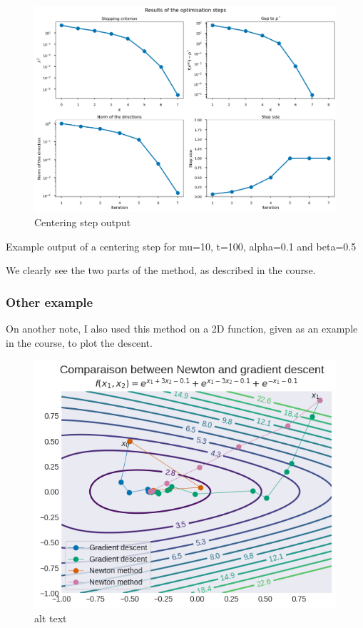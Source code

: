 \documentclass[11pt]{article}
\begin{document}
\begin{figure}
\centering
\includegraphics{outputs/example_output_centering.png}
\caption{Centering step output}
\end{figure}

Example output of a centering step for mu=10, t=100, alpha=0.1 and
beta=0.5

We clearly see the two parts of the method, as described in the course.

    \hypertarget{other-example}{%
\subsubsection{Other example}\label{other-example}}

On another note, I also used this method on a 2D function, given as an
example in the course, to plot the descent.

\begin{figure}
\centering
\includegraphics{outputs/comparaison_newton_gradient_4.png}
\caption{alt text}
\end{figure}
\end{document}
